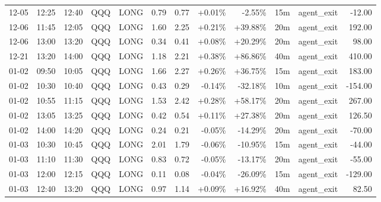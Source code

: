 \documentclass[11pt,a4paper]{article}
\begin{document}
\begin{center}
\begin{longtable}{>{\color{txtmain}}l l l l l r r r r r >{\color{txtmain}}l r}
12-05 & 12:25 & 12:40 & QQQ & LONG & 0.79 & 0.77 & \textcolor{wingreen}{+0.01\%} & \textcolor{lossred}{-2.55\%} & 15m & agent\_exit & \textcolor{lossred}{-12.00} \\
12-06 & 11:45 & 12:05 & QQQ & LONG & 1.60 & 2.25 & \textcolor{wingreen}{+0.21\%} & \textcolor{wingreen}{+39.88\%} & 20m & agent\_exit & \textcolor{wingreen}{192.00} \\
12-06 & 13:00 & 13:20 & QQQ & LONG & 0.34 & 0.41 & \textcolor{wingreen}{+0.08\%} & \textcolor{wingreen}{+20.29\%} & 20m & agent\_exit & \textcolor{wingreen}{98.00} \\
12-21 & 13:20 & 14:00 & QQQ & LONG & 1.18 & 2.21 & \textcolor{wingreen}{+0.38\%} & \textcolor{wingreen}{+86.86\%} & 40m & agent\_exit & \textcolor{wingreen}{410.00} \\
01-02 & 09:50 & 10:05 & QQQ & LONG & 1.66 & 2.27 & \textcolor{wingreen}{+0.26\%} & \textcolor{wingreen}{+36.75\%} & 15m & agent\_exit & \textcolor{wingreen}{183.00} \\
01-02 & 10:30 & 10:40 & QQQ & LONG & 0.43 & 0.29 & \textcolor{lossred}{-0.14\%} & \textcolor{lossred}{-32.18\%} & 10m & agent\_exit & \textcolor{lossred}{-154.00} \\
01-02 & 10:55 & 11:15 & QQQ & LONG & 1.53 & 2.42 & \textcolor{wingreen}{+0.28\%} & \textcolor{wingreen}{+58.17\%} & 20m & agent\_exit & \textcolor{wingreen}{267.00} \\
01-02 & 13:05 & 13:25 & QQQ & LONG & 0.42 & 0.54 & \textcolor{wingreen}{+0.11\%} & \textcolor{wingreen}{+27.38\%} & 20m & agent\_exit & \textcolor{wingreen}{126.50} \\
01-02 & 14:00 & 14:20 & QQQ & LONG & 0.24 & 0.21 & \textcolor{lossred}{-0.05\%} & \textcolor{lossred}{-14.29\%} & 20m & agent\_exit & \textcolor{lossred}{-70.00} \\
01-03 & 10:30 & 10:45 & QQQ & LONG & 2.01 & 1.79 & \textcolor{lossred}{-0.06\%} & \textcolor{lossred}{-10.95\%} & 15m & agent\_exit & \textcolor{lossred}{-44.00} \\
01-03 & 11:10 & 11:30 & QQQ & LONG & 0.83 & 0.72 & \textcolor{lossred}{-0.05\%} & \textcolor{lossred}{-13.17\%} & 20m & agent\_exit & \textcolor{lossred}{-55.00} \\
01-03 & 12:00 & 12:15 & QQQ & LONG & 0.11 & 0.08 & \textcolor{lossred}{-0.04\%} & \textcolor{lossred}{-26.09\%} & 15m & agent\_exit & \textcolor{lossred}{-129.00} \\
01-03 & 12:40 & 13:20 & QQQ & LONG & 0.97 & 1.14 & \textcolor{wingreen}{+0.09\%} & \textcolor{wingreen}{+16.92\%} & 40m & agent\_exit & \textcolor{wingreen}{82.50} \\

\end{longtable}
\end{center}
\end{document}
